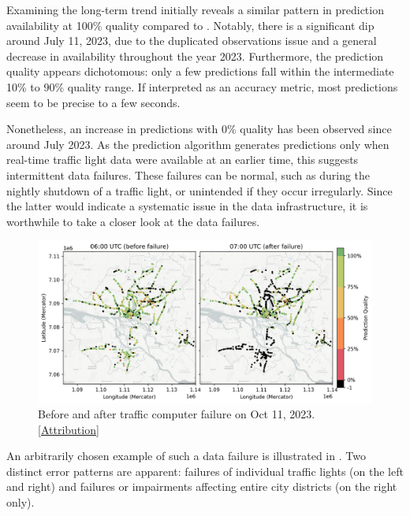 Examining the long-term trend initially reveals a similar pattern in prediction availability at 100\% quality compared to . Notably, there is a significant dip around July 11, 2023, due to the duplicated observations issue and a general decrease in availability throughout the year 2023. Furthermore, the prediction quality appears dichotomous: only a few predictions fall within the intermediate 10\% to 90\% quality range. If interpreted as an accuracy metric, most predictions seem to be precise to a few seconds. 

Nonetheless, an increase in predictions with 0\% quality has been observed since around July 2023. As the prediction algorithm generates predictions only when real-time traffic light data were available at an earlier time, this suggests intermittent data failures. These failures can be normal, such as during the nightly shutdown of a traffic light, or unintended if they occur irregularly. Since the latter would indicate a systematic issue in the data infrastructure, it is worthwhile to take a closer look at the data failures.

\begin{figure}[t]
    \centering
    \includegraphics[width=\linewidth]{images/monitoring-before-after-failure.png}
    \caption{Before and after traffic computer failure on Oct 11, 2023. [\hyperref[attribution]{Attribution}]}\label{fig:monitoring-failure}
\end{figure}

An arbitrarily chosen example of such a data failure is illustrated in . Two distinct error patterns are apparent: failures of individual traffic lights (on the left and right) and failures or impairments affecting entire city districts (on the right only).

